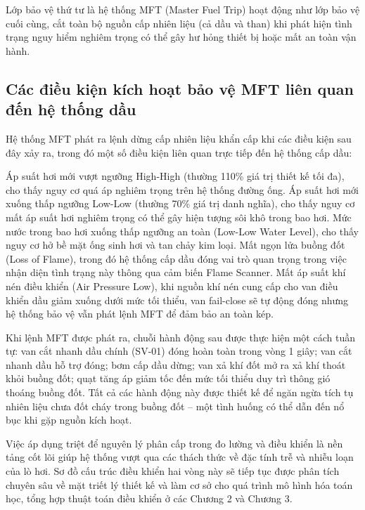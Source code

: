 \documentclass[../main.tex]{subfiles}
\begin{document}
Lớp bảo vệ thứ tư là hệ thống MFT (Master Fuel Trip) hoạt động như lớp bảo vệ cuối cùng, cắt toàn bộ nguồn cấp nhiên liệu (cả dầu và than) khi phát hiện tình trạng nguy hiểm nghiêm trọng có thể gây hư hỏng thiết bị hoặc mất an toàn vận hành.

\subsection{Các điều kiện kích hoạt bảo vệ MFT liên quan đến hệ thống dầu}

Hệ thống MFT phát ra lệnh dừng cấp nhiên liệu khẩn cấp khi các điều kiện sau đây xảy ra, trong đó một số điều kiện liên quan trực tiếp đến hệ thống cấp dầu:

Áp suất hơi mới vượt ngưỡng High-High (thường 110\% giá trị thiết kế tối đa), cho thấy nguy cơ quá áp nghiêm trọng trên hệ thống đường ống. Áp suất hơi mới xuống thấp ngưỡng Low-Low (thường 70\% giá trị danh nghĩa), cho thấy nguy cơ mất áp suất hơi nghiêm trọng có thể gây hiện tượng sôi khô trong bao hơi. Mức nước trong bao hơi xuống thấp ngưỡng an toàn (Low-Low Water Level), cho thấy nguy cơ hở bề mặt ống sinh hơi và tan chảy kim loại. Mất ngọn lửa buồng đốt (Loss of Flame), trong đó hệ thống cấp dầu đóng vai trò quan trọng trong việc nhận diện tình trạng này thông qua cảm biến Flame Scanner. Mất áp suất khí nén điều khiển (Air Pressure Low), khi nguồn khí nén cung cấp cho van điều khiển dầu giảm xuống dưới mức tối thiểu, van fail-close sẽ tự động đóng nhưng hệ thống bảo vệ vẫn phát lệnh MFT để đảm bảo an toàn kép.

Khi lệnh MFT được phát ra, chuỗi hành động sau được thực hiện một cách tuần tự: van cắt nhanh dầu chính (SV-01) đóng hoàn toàn trong vòng 1 giây; van cắt nhanh dầu hỗ trợ đóng; bơm cấp dầu dừng; van xả khí đốt mở ra xả khí thoát khỏi buồng đốt; quạt tăng áp giảm tốc đến mức tối thiểu duy trì thông gió thoáng buồng đốt. Tất cả các hành động này được thiết kế để ngăn ngừa tích tụ nhiên liệu chưa đốt cháy trong buồng đốt -- một tình huống có thể dẫn đến nổ bục khi gặp nguồn kích hoạt.


Việc áp dụng triệt để nguyên lý phân cấp trong đo lường và điều khiển là nền tảng cốt lõi giúp hệ thống vượt qua các thách thức về đặc tính trễ và nhiễu loạn của lò hơi. Sơ đồ cấu trúc điều khiển hai vòng này sẽ tiếp tục được phân tích chuyên sâu về mặt triết lý thiết kế và làm cơ sở cho quá trình mô hình hóa toán học, tổng hợp thuật toán điều khiển ở các Chương 2 và Chương 3.
\end{document}
